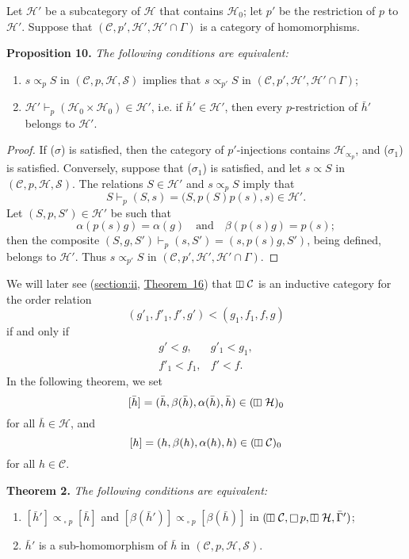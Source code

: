 \documentclass[a4paper,oneside,nobib,nofonts,notitlepage,notoc,nols,fleqn,justified]{tufte-book}
\newenvironment{itenv}[1]
  {\phantomsection\par\medskip\noindent\textbf{#1.}\itshape}
  {\par\medskip}
\newcommand{\oldpage}[1]{{\reversemarginpar\marginnote{\raggedleft\footnotesize\textit{p.~#1}}}}
\newcommand{\CC}{\mathcal{C}}
\newcommand{\HH}{\mathcal{H}}
\renewcommand{\SS}{\mathcal{S}}
\newcommand{\subs}{\mathrel{\propto}}
\DeclareMathOperator{\sq}{\square}
\DeclareMathOperator{\vsq}{\raisebox{-.1em}{\rotatebox{90}{$\boxminus$}\,}}
\begin{document}
Let $\HH'$ be a subcategory of $\HH$ that contains $\HH_0$;
let $p'$ be the restriction of $p$ to $\HH'$.
Suppose that $(\CC,p',\HH',\HH'\cap\Gamma)$ is a category of homomorphisms.

\begin{itenv}{Proposition 10}
\label{proposition:10}
  The following conditions are equivalent:

  \begin{enumerate}
    \item[\normalfont($\sigma$)] $s\subs_p S$ in $(\CC,p,\HH,\SS)$ implies that $s\subs_{p'}S$ in $(\CC,p',\HH',\HH'\cap\Gamma)$;

    \item[\normalfont($\sigma_1$)] $\HH'\vdash_p(\HH_0\times\HH_0)\in\HH'$, i.e. if $\bar{h}'\in\HH'$, then every $p$-restriction of $\bar{h}'$ belongs to $\HH'$.
  \end{enumerate}
\end{itenv}

\begin{proof}
  If ($\sigma$) is satisfied, then the category of $p'$-injections contains $\HH_{\subs_p}$, and ($\sigma_1$) is satisfied.
  Conversely, suppose that ($\sigma_1$) is satisfied, and let $s\subs S$ in $(\CC,p,\HH,\SS)$.
  The relations $S\in\HH'$ and $s\subs_p S$ imply that
  \[
    S\vdash_p(S,s)
    = \big(
      S,p(S)p(s),s
    \big) \in \HH'.
  \]
  Let $(S,p,S')\in\HH'$ be such that
  \[
    \alpha(p(s)g) = \alpha(g)
    \quad\text{and}\quad
    \beta(p(s)g) = p(s);
  \]
  then the composite $(S,g,S')\vdash_p(s,S')=(s,p(s)g,S')$, being defined, belongs to $\HH'$.
  Thus $s\subs_{p'}S$ in $(\CC,p',\HH',\HH'\cap\Gamma)$.
\end{proof}

We will later see (\hyperref[§II]{section:ii}, \hyperref[theorem:16]{Theorem~16}) that $\vsq\CC$ is an inductive category for the order relation
\[
  (g'_1,f'_1,f',g')
  < (g_1,f_1,f,g)
\]
\oldpage{368}
if and only if
\[
  \begin{array}{ll}
    g'<g,
    & g'_1<g_1,
  \\f'_1<f_1,
    & f'<f.
  \end{array}
\]
In the following theorem, we set
\[
  [\bar{h}]
  = (\bar{h},\beta(\bar{h}),\alpha(\bar{h}),\bar{h})
  \in (\vsq\HH)_0
\]
for all $\bar{h}\in\HH$, and
\[
  [h]
  = (h,\beta(h),\alpha(h),h)
  \in (\vsq\CC)_0
\]
for all $h\in\CC$.

\begin{itenv}{Theorem 2}
\label{theorem:2}
  The following conditions are equivalent:
  \begin{enumerate}
    \item[\normalfont(1)] $[\bar{h}']\subs_{\sq p}[\bar{h}]$ and $[\beta(\bar{h}')]\subs_{\sq p}[\beta(\bar{h})]$ in $(\vsq\CC,\sq p,\vsq\HH,\bar{\Gamma}')$;
    \item[\normalfont(2)] $\bar{h}'$ is a sub-homomorphism of $\bar{h}$ in $(\CC,p,\HH,\SS)$.
  \end{enumerate}
\end{itenv}
\end{document}
